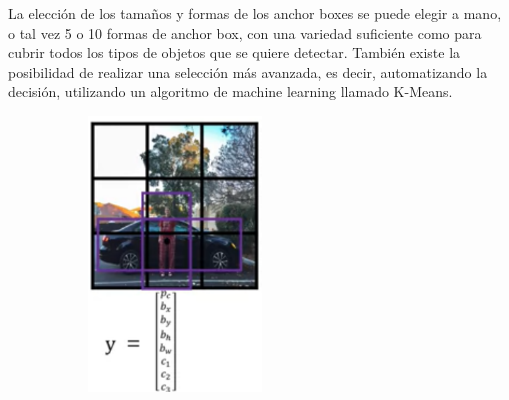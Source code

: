 La elección de los tamaños y formas de los anchor boxes se puede elegir a mano, o tal vez 5 o 10 formas de anchor box, con una variedad suficiente como para cubrir todos los tipos de objetos que se quiere detectar.
También existe la posibilidad de realizar una selección más avanzada, es decir, automatizando la decisión, utilizando un algoritmo de machine learning llamado K-Means.

\begin{figure}[p]
    \centering
    \begin{subfigure}[h!]{.5\textwidth}
        \centering
        \includegraphics[width=\linewidth]{img/anchor-boxes-yolo-1.png}

\end{subfigure}
\end{figure}
